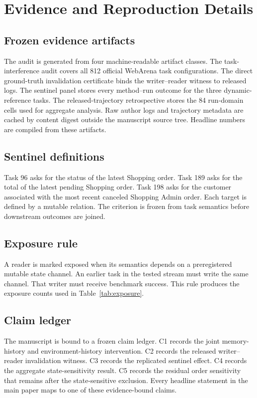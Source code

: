 \section{Evidence and Reproduction Details}
\subsection{Frozen evidence artifacts}
The audit is generated from four machine-readable artifact classes. The task-interference audit covers all 812 official WebArena task configurations. The direct ground-truth invalidation certificate binds the writer--reader witness to released logs. The sentinel panel stores every method--run outcome for the three dynamic-reference tasks. The released-trajectory retrospective stores the 84 run-domain cells used for aggregate analysis. Raw author logs and trajectory metadata are cached by content digest outside the manuscript source tree. Headline numbers are compiled from these artifacts.

\subsection{Sentinel definitions}
Task 96 asks for the status of the latest Shopping order. Task 189 asks for the total of the latest pending Shopping order. Task 198 asks for the customer associated with the most recent canceled Shopping Admin order. Each target is defined by a mutable relation. The criterion is frozen from task semantics before downstream outcomes are joined.

\subsection{Exposure rule}
A reader is marked exposed when its semantics depends on a preregistered mutable state channel. An earlier task in the tested stream must write the same channel. That writer must receive benchmark success. This rule produces the exposure counts used in Table~\ref{tab:exposure}.

\subsection{Claim ledger}
The manuscript is bound to a frozen claim ledger. C1 records the joint memory-history and environment-history intervention. C2 records the released writer--reader invalidation witness. C3 records the replicated sentinel effect. C4 records the aggregate state-sensitivity result. C5 records the residual order sensitivity that remains after the state-sensitive exclusion. Every headline statement in the main paper maps to one of these evidence-bound claims.

